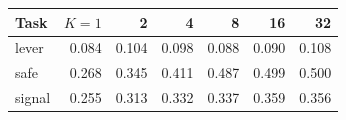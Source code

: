 \begin{tabular}{lrrrrrr}\toprule
Task & $K{=}1$ & 2 & 4 & 8 & 16 & 32 \\ \midrule
lever & 0.084 & 0.104 & 0.098 & 0.088 & 0.090 & 0.108 \\
safe & 0.268 & 0.345 & 0.411 & 0.487 & 0.499 & 0.500 \\
signal & 0.255 & 0.313 & 0.332 & 0.337 & 0.359 & 0.356 \\
\bottomrule\end{tabular}